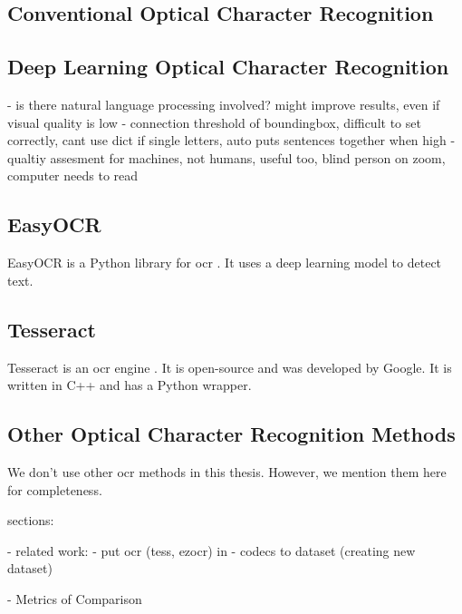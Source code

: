 \subsection{Conventional Optical Character Recognition}

\subsection{Deep Learning Optical Character Recognition}

- is there natural language processing involved? might improve results, even if visual quality is low
- connection threshold of boundingbox, difficult to set correctly, cant use dict if single letters, auto puts sentences together when high
- qualtiy assesment for machines, not humans, useful too, blind person on zoom, computer needs to read

\subsection{EasyOCR}
\label{subsec:easyocr}

EasyOCR is a Python library for \gls{ocr} \cite{easyocr_2020}. It uses a deep learning model to detect text.

\subsection{Tesseract}
\label{subsec:tesseract}

Tesseract is an \gls{ocr} engine \cite{tesseract_2007}. It is open-source and was developed by Google. It is written in C++ and has a Python wrapper.

\subsection{Other Optical Character Recognition Methods}
\label{subsec:other_ocr_methods}

We don't use other \gls{ocr} methods in this thesis.
However, we mention them here for completeness.

sections:

- related work:
    - put ocr (tess, ezocr) in
- codecs to dataset (creating new dataset)

- Metrics of Comparison




